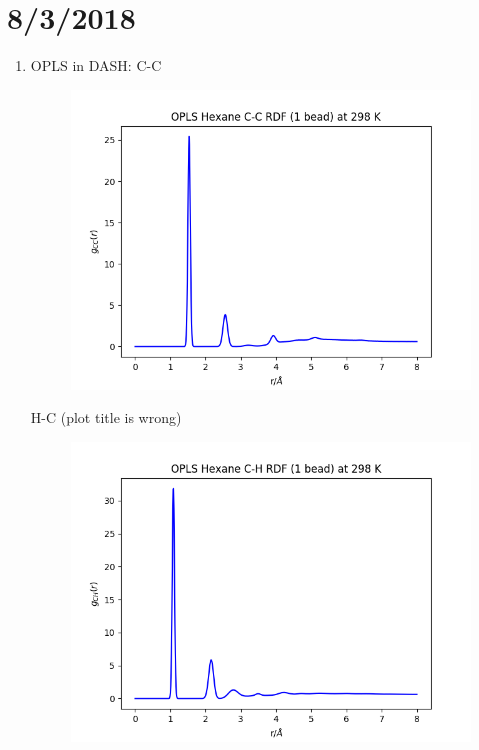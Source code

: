\documentclass[12pt,reqno]{amsart}
\numberwithin{equation}{section}
\begin{document}
\section{8/3/2018}
\begin{enumerate}
\item OPLS in DASH: 
C-C
\begin{figure}[H]
\centering
\includegraphics[scale=0.6]{C_C-1bead-bonded-OPLS-hexane-298-bin01}
\end{figure}

H-C (plot title is wrong)
\begin{figure}[H]
\centering
\includegraphics[scale=0.6]{C_H-1bead-bonded-OPLS-hexane-298-bin01}
\end{figure}


\end{enumerate}
\end{document}
